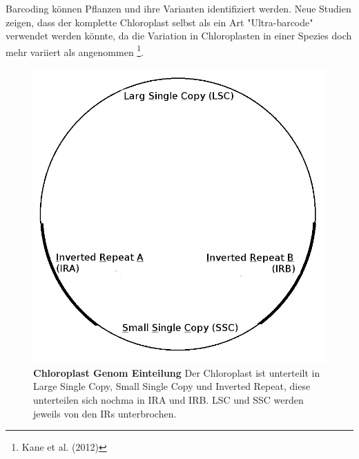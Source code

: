 \documentclass{scrartcl}
\begin{document}
Barcoding können Pflanzen und ihre Varianten identifiziert werden. Neue Studien zeigen, dass der komplette Chloroplast selbst als ein Art "Ultra-barcode"
verwendet werden könnte, da die Variation in Chloroplasten in einer Spezies doch mehr variiert als angenommen \footnote{Kane et al. (2012)}. 
\begin{figure}
\includegraphics[width=.9\linewidth]{./Chloroplast_1.png}
\caption[Chloroplast Genom Einteilung]{\textbf{Chloroplast Genom Einteilung} Der Chloroplast ist unterteilt in Large Single Copy, Small Single Copy und Inverted Repeat, diese unterteilen sich nochma in IRA und IRB. LSC und SSC werden jeweils von den IRs unterbrochen.}
\end{figure}
\end{document}
